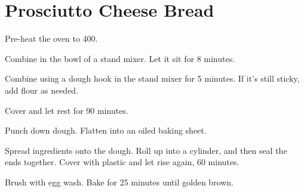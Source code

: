\section{Prosciutto Cheese Bread}
\begin{recipe}


Pre-heat the oven to 400\degree{}. 


Combine in the bowl of a stand mixer. Let it sit for 8 minutes. 


Combine using a dough hook in the stand mixer for 5 minutes. If it's still 
sticky, add flour as needed. 

Cover and let rest for 90 minutes. 

Punch down dough. Flatten into an oiled baking sheet. 


Spread ingredients onto the dough. Roll up into a cylinder, and then seal
the ends together. Cover with plastic and let rise again, 60 minutes. 


Brush with egg wash. Bake for 25 minutes until golden brown. 

\end{recipe}
